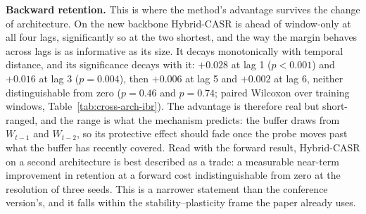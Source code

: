 \documentclass[a4paper,twoside]{article}
\begin{document}
\begin{table}[t]
  \centering
  \caption{Immediate Backward Retention across backbones. Decay $=(\mathrm{IBR@1}-\mathrm{IBR@6})/\mathrm{IBR@1}$. Absolute levels are not comparable with Table~\ref{tab:retention-detailed} (see text).}
  \label{tab:cross-arch-ibr}
\end{table}

\textbf{Backward retention.} This is where the method's advantage survives the change of architecture. On the new backbone Hybrid-CASR is ahead of window-only at all four lags, significantly so at the two shortest, and the way the margin behaves across lags is as informative as its size. It decays monotonically with temporal distance, and its significance decays with it: $+0.028$ at lag 1 ($p<0.001$) and $+0.016$ at lag 3 ($p=0.004$), then $+0.006$ at lag 5 and $+0.002$ at lag 6, neither distinguishable from zero ($p=0.46$ and $p=0.74$; paired Wilcoxon over training windows, Table~\ref{tab:cross-arch-ibr}). The advantage is therefore real but short-ranged, and the range is what the mechanism predicts: the buffer draws from $W_{t-1}$ and $W_{t-2}$, so its protective effect should fade once the probe moves past what the buffer has recently covered. Read with the forward result, Hybrid-CASR on a second architecture is best described as a trade: a measurable near-term improvement in retention at a forward cost indistinguishable from zero at the resolution of three seeds. This is a narrower statement than the conference version's, and it falls within the stability--plasticity frame the paper already uses.
\end{document}

